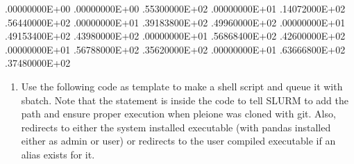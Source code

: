 \documentclass[letterpaper,10pt,english]{sphinxmanual}
\begin{document}
%
\begin{sphinxVerbatim}[commandchars=\\\{\}]
 .00000000E+00  .00000000E+00  .55300000E+02
 .00000000E+01  .14072000E+02  .56440000E+02
 .00000000E+01  .39183800E+02  .49960000E+02
 .00000000E+01  .49153400E+02  .43980000E+02
 .00000000E+01  .56868400E+02  .42600000E+02
 .00000000E+01  .56788000E+02  .35620000E+02
 .00000000E+01  .63666800E+02  .37480000E+02
\end{sphinxVerbatim}
\begin{enumerate}
\def\theenumi{\arabic{enumi}}
\def\labelenumi{\theenumi .}
\makeatletter\def\p@enumii{\p@enumi \theenumi .}\makeatother
\setcounter{enumi}{2}
\item {} 

Use the following code as template to make a shell script and queue it with
sbatch. Note that the  statement is inside the code to tell SLURM
to add the path and ensure proper execution when pleione was cloned with
git. Also,  redirects to either the system installed executable
(with pandas installed either as admin or user) or redirects to the user
compiled executable if an alias exists for it.

\end{enumerate}
\end{document}
